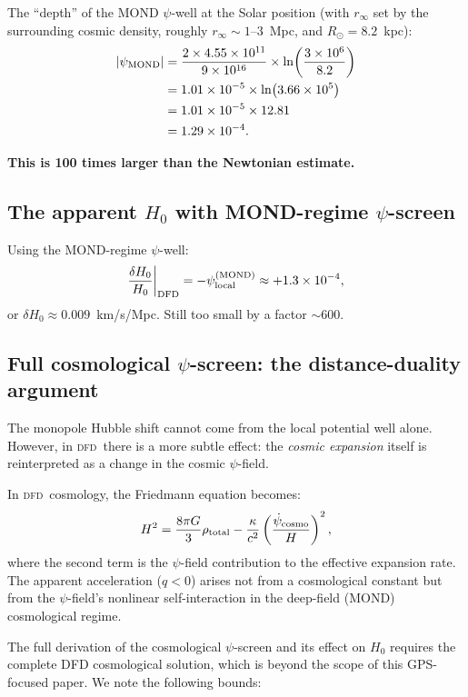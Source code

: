 \documentclass[aps,prl,twocolumn,superscriptaddress,showpacs]{revtex4-2}
\newcommand{\DFD}{\textsc{dfd}}
\begin{document}
The ``depth'' of the MOND $\psi$-well at the Solar position
(with $r_\infty$ set by the surrounding cosmic density, roughly
$r_\infty \sim 1$--$3$~Mpc, and $R_\odot = 8.2$~kpc):
\begin{align}
|\psi_{\rm MOND}| &= \frac{2\times 4.55\times 10^{11}}{9\times 10^{16}}
\times\ln\!\left(\frac{3\times 10^6}{8.2}\right) \nonumber\\
&= 1.01\times 10^{-5}\times\ln(3.66\times 10^5) \nonumber\\
&= 1.01\times 10^{-5}\times 12.81 \nonumber\\
&= 1.29\times 10^{-4}.
\label{eq:psi_MOND_well}
\end{align}

\textbf{This is 100 times larger than the Newtonian estimate.}

\subsection{The apparent $H_0$ with MOND-regime $\psi$-screen}

Using the MOND-regime $\psi$-well:
\begin{equation}
\frac{\delta H_0}{H_0}\bigg|_{\rm DFD}
= -\psi_{\rm local}^{(\rm MOND)} \approx +1.3\times 10^{-4},
\end{equation}
or $\delta H_0 \approx 0.009$~km/s/Mpc.  Still too small by a
factor $\sim 600$.

\subsection{Full cosmological $\psi$-screen: the distance-duality argument}

The monopole Hubble shift cannot come from the local potential well
alone.  However, in \DFD\, there is a more subtle effect: the
\emph{cosmic expansion} itself is reinterpreted as a change in the
cosmic $\psi$-field.

In \DFD\ cosmology, the Friedmann equation becomes:
\begin{equation}
H^2 = \frac{8\pi G}{3}\rho_{\rm total}
- \frac{\kappa}{c^2}\left(\frac{\dot\psi_{\rm cosmo}}{H}\right)^2,
\end{equation}
where the second term is the $\psi$-field contribution to the
effective expansion rate.  The apparent acceleration ($q < 0$)
arises not from a cosmological constant but from the $\psi$-field's
nonlinear self-interaction in the deep-field (MOND) cosmological
regime.

The full derivation of the cosmological $\psi$-screen and its
effect on $H_0$ requires the complete DFD cosmological solution,
which is beyond the scope of this GPS-focused paper.  We note
the following bounds:
\end{document}
